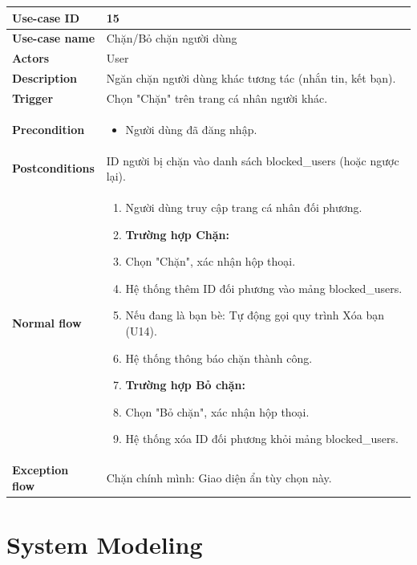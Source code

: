 \documentclass[a4paper, 12pt]{article}
\begin{document}
	\begin{longtable}{|p{3.5cm}|p{12cm}|}
		\hline
		\textbf{Use-case ID} & 15 \\
		\hline
		\textbf{Use-case name} & Chặn/Bỏ chặn người dùng \\
		\hline
		\textbf{Actors} & User \\
		\hline
		\textbf{Description} & Ngăn chặn người dùng khác tương tác (nhắn tin, kết bạn). \\
		\hline
		\textbf{Trigger} & Chọn "Chặn" trên trang cá nhân người khác. \\
		\hline
		\textbf{Precondition} & 
		\begin{itemize}[label=+]
			\item Người dùng đã đăng nhập.
		\end{itemize} \\
		\hline
		\textbf{Postconditions} & ID người bị chặn vào danh sách blocked\_users (hoặc ngược lại). \\
		\hline
		\textbf{Normal flow} & 
		\begin{enumerate}
			\item Người dùng truy cập trang cá nhân đối phương.
			\item[] \textbf{Trường hợp Chặn:}
			\item Chọn "Chặn", xác nhận hộp thoại.
			\item Hệ thống thêm ID đối phương vào mảng blocked\_users.
			\item Nếu đang là bạn bè: Tự động gọi quy trình Xóa bạn (U14).
			\item Hệ thống thông báo chặn thành công.
			\item[] \textbf{Trường hợp Bỏ chặn:}
			\item Chọn "Bỏ chặn", xác nhận hộp thoại.
			\item Hệ thống xóa ID đối phương khỏi mảng blocked\_users.
		\end{enumerate} \\
		\hline
		\textbf{Exception flow} &  Chặn chính mình: Giao diện ẩn tùy chọn này.\\
		\hline
	\end{longtable}
	
	
	\section{System Modeling}
\end{document}
